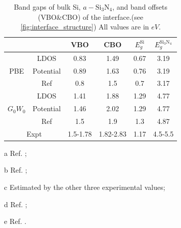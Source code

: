 \documentclass[aip,preprint]{revtex4-1}
\begin{document}
	\begin{table}
		\centering
		\begin{threeparttable}
		\caption{Band gaps of bulk Si, $a-\mathrm{Si_3N_4}$, and band offsets (VBO\&CBO) of the interface.(see \autoref{fig:interface_structure}) All values are in $\si{eV}$.}
		\label{tab:bandoffsets}
		\begin{tabular}{cc|cccc}
			\hline\hline
			 \multicolumn{2}{c|}{\diagbox{Method}{Energy}} 	& VBO & CBO & $E_g^\mathrm{Si}$ & $E_g^\mathrm{Si_3N_4}$ \\
			\hline
			\multirow{3}{*}{PBE} 				& LDOS      		& 0.83 & 1.49 & 0.67 & 3.19 \\
													 				& Potential 		& 0.89 & 1.63 & 0.76 & 3.19 \\
													 				& Ref\tnote{a}  & 0.8  & 1.5  & 0.7  & 3.17 \\
			\hline
			\multirow{3}{*}{$G_0W_0$}		& LDOS  				& 1.41 & 1.88 & 1.29 & 4.77 \\
																	& Potential 		& 1.46 & 2.02 & 1.29 & 4.77 \\
																	& Ref\tnote{a} 	& 1.5  & 1.9  & 1.3  & 4.87 \\
			\hline
			\multicolumn{2}{c|}{Expt}               		& 1.5-1.78\tnote{b} & 1.82-2.83\tnote{c} & 1.17\tnote{d} & 4.5-5.5\tnote{e} \\
			\hline\hline
		\end{tabular}
		\begin{tablenotes}
			\item[a] Ref. ;
			\item[b] Ref. ;
			\item[c] Estimated by the other three experimental values;
			\item[d] Ref. ;
			\item[e] Ref. .
		\end{tablenotes}
	\end{threeparttable}
	\end{table}
	
\end{document}
